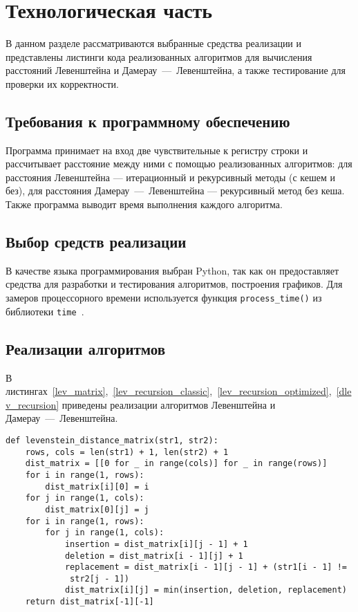 \section{Технологическая часть}

\noindent
В данном разделе рассматриваются выбранные средства реализации и представлены листинги кода реализованных алгоритмов для вычисления расстояний Левенштейна и Дамерау~---~Левенштейна, а также тестирование для проверки их корректности.

\subsection{Требования к программному обеспечению}

\noindent
\hspace{0.75cm}
Программа принимает на вход две чувствительные к регистру строки и рассчитывает расстояние между ними с помощью реализованных алгоритмов: для расстояния Левенштейна — итерационный и рекурсивный методы (с кешем и без), для расстояния Дамерау~---~Левенштейна — рекурсивный метод без кеша. Также программа выводит время выполнения каждого алгоритма.

\subsection{Выбор средств реализации}

\noindent
\hspace{0.75cm}
В качестве языка программирования выбран Python, так как он предоставляет средства для разработки и тестирования алгоритмов, построения графиков. Для замеров процессорного времени используется функция \texttt{process\_time()} из библиотеки \texttt{time}~\cite{process_time_text}.

\subsection{Реализации алгоритмов}

\noindent
\hspace{0.75cm}
В листингах~\ref{lev_matrix},~\ref{lev_recursion_classic},~\ref{lev_recursion_optimized},~\ref{dlev_recursion} приведены реализации алгоритмов Левенштейна и Дамерау~---~Левенштейна.

\begin{lstlisting}[caption=Итеративная реализация алгоритма Левенштейна с заполнением матрицы, label=lev_matrix]
def levenstein_distance_matrix(str1, str2):
    rows, cols = len(str1) + 1, len(str2) + 1
    dist_matrix = [[0 for _ in range(cols)] for _ in range(rows)]
    for i in range(1, rows):
        dist_matrix[i][0] = i
    for j in range(1, cols):
        dist_matrix[0][j] = j
    for i in range(1, rows):
        for j in range(1, cols):
            insertion = dist_matrix[i][j - 1] + 1
            deletion = dist_matrix[i - 1][j] + 1
            replacement = dist_matrix[i - 1][j - 1] + (str1[i - 1] !=
             str2[j - 1])
            dist_matrix[i][j] = min(insertion, deletion, replacement)
    return dist_matrix[-1][-1]
\end{lstlisting}

